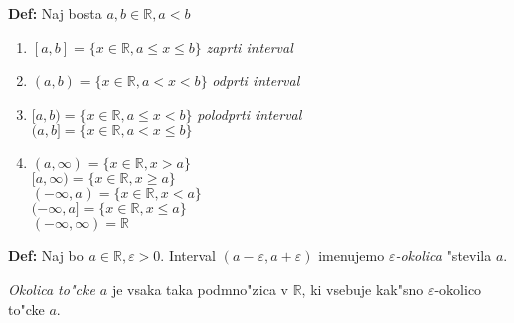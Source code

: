 \textbf{Def:} Naj bosta $a, b \in \mathbb{R}, a < b$
\begin{enumerate}
	\item $[a,b] = \{x \in \mathbb{R}, a \leq x \leq b\}$  \emph{zaprti interval}
	\item $(a, b) = \{x \in \mathbb{R}, a < x < b\}$ \emph{odprti interval}
	\item $[a, b) = \{x \in \mathbb{R}, a \leq x < b\}$ \emph{polodprti interval}\\
	$(a, b] = \{x \in \mathbb{R}, a < x \leq b\}$
	\item $(a, \infty) = \{x \in \mathbb{R}, x > a\}$\\
	$[a, \infty) = \{x \in \mathbb{R}, x \geq a\}$\\
	$(-\infty, a) = \{x \in \mathbb{R}, x < a\}$\\
	$(-\infty, a] = \{x \in \mathbb{R}, x \leq a\}$\\
	$(-\infty, \infty) = \mathbb{R}$
\end{enumerate}

\textbf{Def:} Naj bo $a \in \mathbb{R}, \varepsilon > 0$. Interval $(a-\varepsilon, a + \varepsilon)$ imenujemo \emph{$\varepsilon$-okolica} "stevila $a$.

\emph{Okolica to"cke $a$} je vsaka taka podmno"zica v $\mathbb{R}$, ki vsebuje kak"sno $\varepsilon$-okolico to"cke $a$.